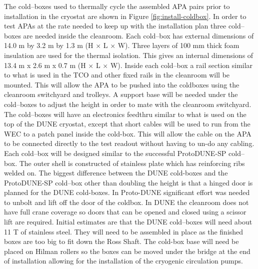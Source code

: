 The cold--boxes used to thermally cycle the assembled APA pairs prior to installation in the cryostat are shown in Figure \ref{fig:install-coldbox}. 
In order to test APAs at the rate needed to keep up with the installation plan three cold--boxes are needed inside the cleanroom. 
Each cold--box has external dimensions of 14.0 \si{m} by 3.2 \si{m} by 1.3 \si{m} (H $\times$ L $\times$ W). 
Three layers of 100 \si{mm} thick foam insulation are used for the thermal isolation. 
This gives an internal dimensions of 13.4 \si{m} x 2.6 \si{m} x 0.7 \si{m} (H $\times$ L $\times$ W). 
Inside each cold--box a rail section similar to what is used in the TCO and other fixed rails in the cleanroom will be mounted.
This will allow the APA to be pushed into the coldboxes using the cleanroom switchyard and trolleys. 
A support base will be needed under the cold--boxes to adjust the height in order to mate with the cleanroom switchyard.
The cold--boxes will have an electronics feedthru similar to what is used on the top of the DUNE cryostat, except that short cables will be used to run from the WEC to a patch panel inside the cold-box.
This will allow the cable on the APA to be connected directly to the test readout without having to un-do any cabling. 
Each cold--box will be designed similar to the successful ProtoDUNE-SP cold--box. 
The outer shell is constructed of stainless plate which has reinforcing ribs welded on. 
The biggest difference between the DUNE cold-boxes and the ProtoDUNE-SP cold--box other than doubling the height is that a hinged door is planned for the DUNE cold-boxes. 
In Proto-DUNE significant effort was needed to unbolt and lift off the door of the coldbox. 
In DUNE the cleanroom does not have full crane coverage so doors that can be opened and closed using a scissor lift are required.
Initial estimates are that the DUNE cold--boxes will need about 11 \si{T} of stainless steel. 
They will need to be assembled in place as the finished boxes are too big to fit down the Ross Shaft. 
The cold-box base will need be placed on Hilman rollers so the boxes can be moved under the bridge at the end of installation allowing for the installation of the cryogenic circulation pumps.
 





